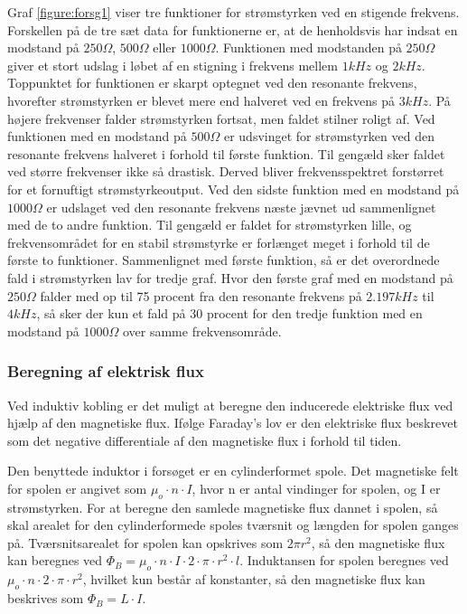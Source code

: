 Graf \ref{figure:forsg1} viser tre funktioner for strømstyrken ved en stigende frekvens. Forskellen på de tre sæt data for funktionerne er, at de henholdsvis har indsat en modstand på $250 \Omega$, $500 \Omega$ eller $1000 \Omega$. Funktionen med modstanden på $250 \Omega$ giver et stort udslag i løbet af en stigning i frekvens mellem $1 kHz$ og $2 kHz$. Toppunktet for funktionen er skarpt optegnet ved den resonante frekvens, hvorefter strømstyrken er blevet mere end halveret ved en frekvens på $3 kHz$. På højere frekvenser falder strømstyrken fortsat, men faldet stilner roligt af. Ved funktionen med en modstand på $500 \Omega$ er udsvinget for strømstyrken ved den resonante frekvens halveret i forhold til første funktion. Til gengæld sker faldet ved større frekvenser ikke så drastisk. Derved bliver frekvensspektret forstørret for et fornuftigt strømstyrkeoutput. Ved den sidste funktion med en modstand på $1000 \Omega$ er udslaget ved den resonante frekvens næste jævnet ud sammenlignet med de to andre funktion. Til gengæld er faldet for strømstyrken lille, og frekvensområdet for en stabil strømstyrke er forlænget meget i forhold til de første to funktioner. Sammenlignet med første funktion, så er det overordnede fald i strømstyrken lav for tredje graf. Hvor den første graf med en modstand på $250 \Omega$ falder med op til 75 procent fra den resonante frekvens på $2.197 kHz$ til $4 kHz$, så sker der kun et fald på 30 procent for den tredje funktion med en modstand på $1000 \Omega$ over samme frekvensområde.

\subsubsection{Beregning af elektrisk flux}

Ved induktiv kobling er det muligt at beregne den inducerede elektriske flux ved hjælp af den magnetiske flux. Ifølge Faraday's lov er den elektriske flux beskrevet som det negative differentiale af den magnetiske flux i forhold til tiden.

Den benyttede induktor i forsøget er en cylinderformet spole. Det magnetiske felt for spolen er angivet som $\mu_o \cdot n \cdot I$, hvor n er antal vindinger for spolen, og I er strømstyrken. For at beregne den samlede magnetiske flux dannet i spolen, så skal arealet for den cylinderformede spoles tværsnit og længden for spolen ganges på. Tværsnitsarealet for spolen kan opskrives som $2 \pi r^2$, så den magnetiske flux kan beregnes ved $\Phi_B = \mu_o \cdot n \cdot I \cdot 2 \cdot \pi \cdot r^2 \cdot l$. Induktansen for spolen beregnes ved $\mu_o \cdot n \cdot 2 \cdot \pi \cdot r^2$, hvilket kun består af konstanter, så den magnetiske flux kan beskrives som $\Phi_B = L \cdot I$.

